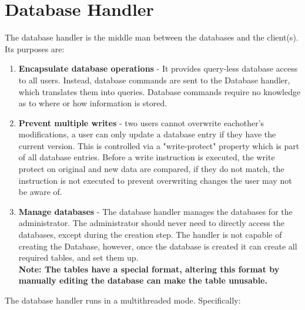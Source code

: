 \documentclass[letterpaper]{report}
\begin{document}
	\section{Database Handler}
	The database handler is the middle man between the databases and the client(s). Its purposes are:
	\begin{enumerate}
		\item \textbf{Encapsulate database operations} - It provides query-less database access to all users. Instead, database commands are sent to the Database handler, which translates them into queries. Database commands require no knowledge as to where or how information is stored.
		\item \textbf{Prevent multiple writes} - two users cannot overwrite eachother's modifications, a user can only update a database entry if they have the current version. This is controlled via a "write-protect" property which is part of all database entries. Before a write instruction is executed, the write protect on original and new data are compared, if they do not match, the instruction is not executed to prevent overwriting changes the user may not be aware of.
		\item \textbf{Manage databases} - The database handler manages the databases for the administrator. The administrator should never need to directly access the databases, except during the creation step. The handler is not capable of creating the Database, however, once the database is created it can create all required tables, and set them up. \\ \textbf{Note: The tables have a special format, altering this format by manually editing the database can make the table unusable.}
	\end{enumerate}
	The database handler runs in a multithreaded mode. Specifically:
\end{document}

